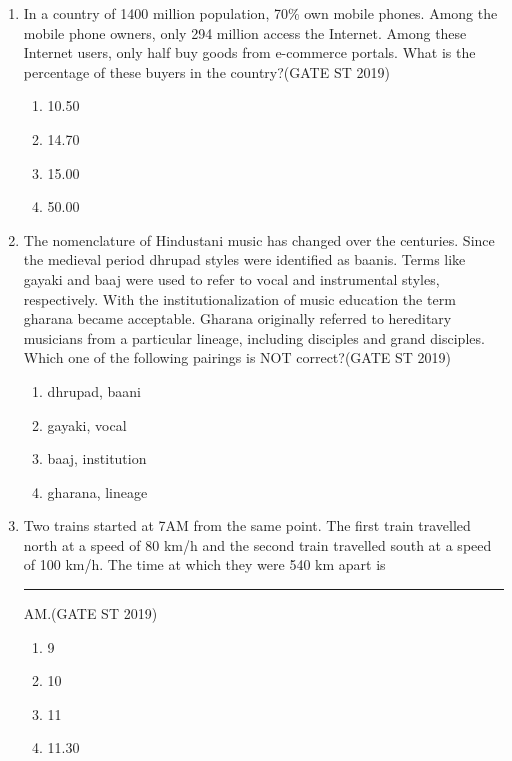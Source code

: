 \documentclass[journal]{IEEEtran}
\begin{document}
\begin{enumerate}
\item In a country of 1400 million population, 70\% own mobile phones. Among the mobile phone owners, only 294 million access the Internet. Among these Internet users, only half buy goods from e-commerce portals. What is the percentage of these buyers in the country?\hfill(GATE ST 2019)
\begin{multicols}{4}
\begin{enumerate}
    \item 10.50
    \item 14.70
    \item 15.00
    \item 50.00
\end{enumerate}
\end{multicols}

\item The nomenclature of Hindustani music has changed over the centuries. Since the medieval period dhrupad styles were identified as baanis. Terms like gayaki and baaj were used to refer to vocal and instrumental styles, respectively. With the institutionalization of music education the term gharana became acceptable. Gharana originally referred to hereditary musicians from a particular lineage, including disciples and grand disciples. \\
Which one of the following pairings is NOT correct?\hfill(GATE ST 2019)
\begin{enumerate}
    \item dhrupad, baani 
    \item gayaki, vocal 
    \item baaj, institution 
    \item gharana, lineage 
\end{enumerate}

\item Two trains started at 7AM from the same point. The first train travelled north at a speed of 80 km/h and the second train travelled south at a speed of 100 km/h. The time at which they were 540 km apart is \rule{2cm}{0.1pt} AM.\hfill(GATE ST 2019)
\begin{multicols}{4}
\begin{enumerate}
    \item 9
    \item 10
    \item 11
    \item 11.30
\end{enumerate}
\end{multicols}


\end{enumerate}
\end{document}
